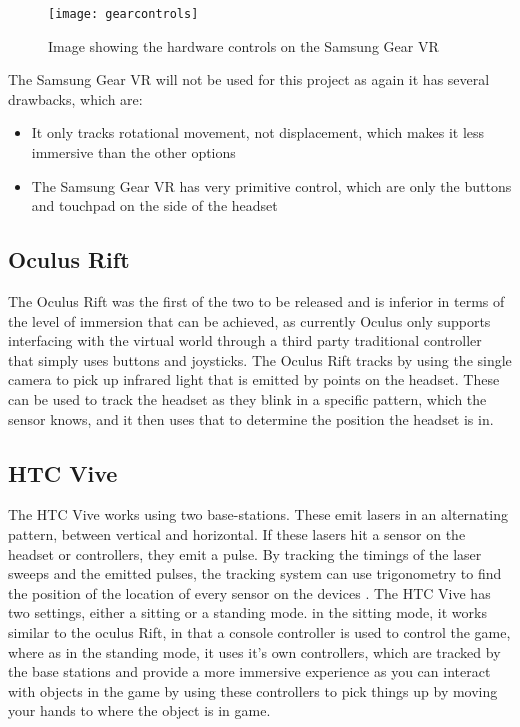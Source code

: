 \begin{figure}[H]
	\texttt{[image: gearcontrols]}
	\centering
	\caption{Image showing the hardware controls on the Samsung Gear VR}
	\label{fig:gearcontrols}
\end{figure}

	The Samsung Gear VR will not be used for this project as again it has several drawbacks, which are:

\begin{itemize}
	\item It only tracks rotational movement, not displacement, which makes it less immersive than the other options
	\item The Samsung Gear VR has very primitive control, which are only the buttons and touchpad on the side of the headset
\end{itemize}		


\subsection{Oculus Rift}
	The Oculus Rift was the first of the two to be released and is inferior in terms of the level of immersion that can be achieved, as currently Oculus only supports interfacing with the virtual world through a third party traditional controller that simply uses buttons and joysticks.
The Oculus Rift tracks by using the single camera to pick up infrared light that is emitted by points on the headset. These can be used to track the headset as they blink in a specific pattern, which the sensor knows, and it then uses that to determine the position the headset is in.

\subsection{HTC Vive}
The HTC Vive works using two base-stations. These emit lasers in an alternating pattern, between vertical and horizontal. If these lasers hit a sensor on the headset or controllers, they emit a pulse. By tracking the timings of the laser sweeps and the emitted pulses, the tracking system can use trigonometry to find the position of the location of every sensor on the devices \cite{vivetechnology}.
	The HTC Vive has two settings, either a sitting or a standing mode. in the sitting mode, it works similar to the oculus Rift, in that a console controller is used to control the game, where as in the standing mode, it uses it's own controllers, which are tracked by the base stations and provide a more immersive experience as you can interact with objects in the game by using these controllers to pick things up by moving your hands to where the object is in game.

